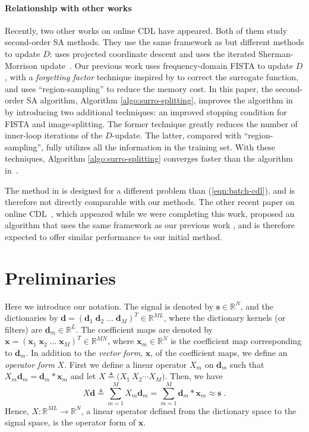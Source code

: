 \documentclass[final]{siamart1116}
\newcommand{\mb}[1]{\mathbf{#1}}
\def \R  {\mathbb{R}}
\begin{document}
\paragraph{Relationship with other works}
Recently, two other works on online CDL \cite{degraux-2017-online, wang2017online} have appeared. Both of them study second-order SA methods. They use the same framework as \cite{mairal2009online} but different methods to update $D$: \cite{degraux-2017-online} uses projected coordinate descent and \cite{wang2017online} uses the iterated Sherman-Morrison update~\cite{wohlberg-2016-efficient}. Our previous work \cite{liu-2017-online} uses frequency-domain FISTA to update $D$, with a \emph{forgetting factor} technique inspired by \cite{skretting-2010-recursive, mairal-2010-online} to correct the surrogate function, and uses ``region-sampling'' to reduce the memory cost.  In this paper, the second-order SA algorithm, Algorithm \ref{algo:surro-splitting}, improves the algorithm in~\cite{liu-2017-online} by introducing two additional techniques: an improved stopping condition for FISTA and image-splitting. The former technique greatly reduces the number of inner-loop iterations of the $D$-update. The latter, compared with ``region-sampling'', fully utilizes all the information in the training set. With these techniques, Algorithm \ref{algo:surro-splitting} converges faster than the algorithm in~\cite{liu-2017-online}.

The method in \cite{degraux-2017-online} is designed for a different problem than (\ref{eqn:batch-cdl}), and is therefore not directly comparable with our methods. The other recent paper on online CDL~\cite{wang2017online}, which appeared while we were completing this work, proposed an algorithm that uses the same framework as our previous work \cite{liu-2017-online}, and is therefore expected to offer similar performance to our initial method.


\section{Preliminaries}
\label{sec:pre}

Here we introduce our notation. The signal is denoted by $\mb{s}\in\R^N$, and the dictionaries by $\mb{d} = (\mb{d}_1 \; \mb{d}_2 \; \ldots\; \mb{d}_M)^T \in \R^{ML}$, where the dictionary kernels (or filters) are $\mb{d}_m \in \R^{L}$.  The coefficient maps are denoted by $\mb{x} = (\mb{x}_1 \; \mb{x}_2 \; \ldots\; \mb{x}_M)^T \in \R^{MN}$, where $\mb{x}_m\in\R^{N}$ is the coefficient map corresponding to $\mb{d}_m$.  In addition to the \emph{vector form}, $\mb{x}$, of the coefficient maps, we define an \emph{operator form} $X$. First we define a linear operator $X_m$ on $\mb{d}_m$ such that $X_{m}\mb{d}_m=\mb{d}_m \ast \mb{x}_{m}$ and let $X \triangleq \big(X_{1}~X_{2}\cdots X_{M}\big)$. Then, we have
\begin{equation}\label{eqn:operatorX}
 X \mb{d} \triangleq \sum_{m=1}^MX_m\mb{d}_m = \sum_{m=1}^M \mb{d}_m \ast \mb{x}_{m} \approx \mb{s} \;.
\end{equation}
Hence, $X : \R^{ML}\to\R^{N}$, a linear operator defined from the dictionary space to the signal space, is the operator form of $\mb{x}$.
\end{document}
